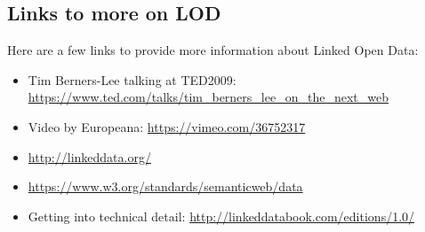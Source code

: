 \subsection<article>{Links to more on LOD}
Here are a few links to provide more information about Linked Open Data:

  \begin{itemize}
    \item Tim Berners-Lee talking at TED2009: \url{https://www.ted.com/talks/tim_berners_lee_on_the_next_web}
    \item Video by Europeana: \url{https://vimeo.com/36752317}
    \item \url{http://linkeddata.org/}
    \item \url{https://www.w3.org/standards/semanticweb/data}
    \item Getting into technical detail: \url{http://linkeddatabook.com/editions/1.0/}
  \end{itemize}



